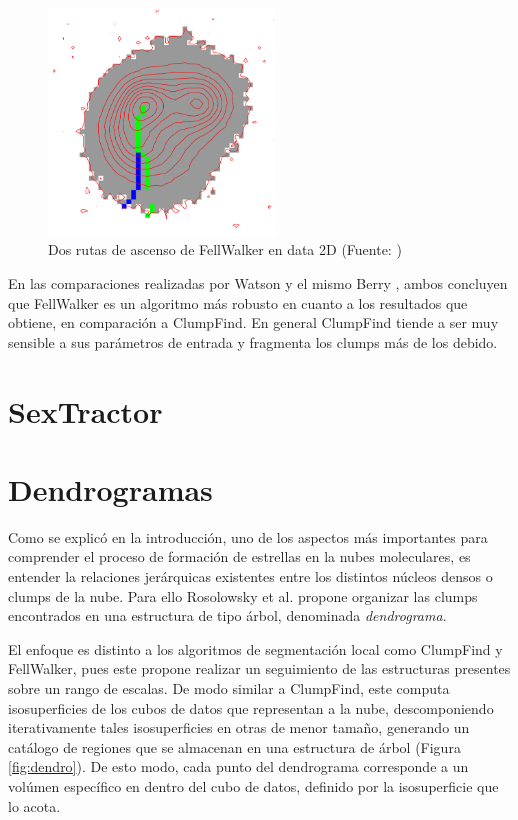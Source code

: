 \begin{figure}[htpb!]
\centering
\includegraphics[width=6cm]{fw}
\caption{Dos rutas de ascenso de FellWalker en data 2D (Fuente: \cite{Berry})}
\label{fig:fw}
\end{figure}

En las comparaciones realizadas por Watson \cite{Watson} y el mismo Berry \cite{Berry}, ambos concluyen que FellWalker es un algoritmo más robusto en cuanto a los resultados que obtiene, en comparación a ClumpFind. En general ClumpFind tiende a ser muy sensible a sus parámetros de entrada y fragmenta los clumps más de los debido. 





\section{SexTractor}






\section{Dendrogramas}
Como se explicó en la introducción, uno de los aspectos más importantes para comprender el proceso de formación de estrellas en la nubes moleculares, es entender la relaciones jerárquicas existentes entre los distintos núcleos densos o clumps de la nube. Para ello Rosolowsky et al. \cite{Rosolowsky} propone organizar las clumps encontrados en una estructura de tipo árbol, denominada \textit{dendrograma}.

El enfoque es distinto a los algoritmos de segmentación local como ClumpFind y FellWalker, pues este propone realizar un seguimiento de las estructuras presentes sobre un rango de escalas. De modo similar a ClumpFind, este computa isosuperficies de los cubos de datos que representan a la nube, descomponiendo iterativamente tales isosuperficies en otras de menor tamaño, generando un catálogo de regiones que se almacenan en una estructura de árbol (Figura \ref{fig:dendro}). De esto modo, cada punto del dendrograma corresponde a un volúmen específico en dentro del cubo de datos, definido por la isosuperficie que lo acota.  


